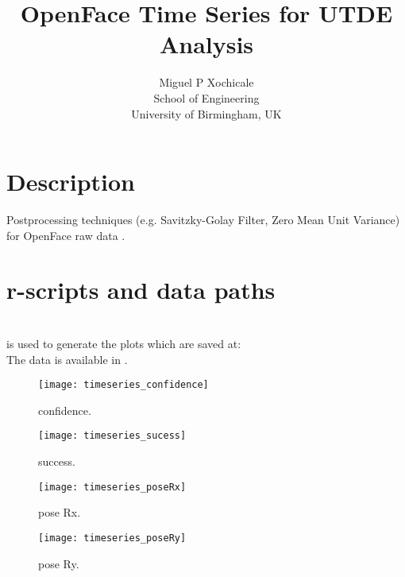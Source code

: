 \documentclass[a4paper,12pt]{article}
\title{OpenFace Time Series for UTDE Analysis}
\author{Miguel P Xochicale \\
School of Engineering\\
University of Birmingham, UK}
\begin{document}
\maketitle

%


\section{Description}


Postprocessing techniques (e.g. Savitzky-Golay Filter, Zero Mean Unit Variance)
for OpenFace raw data \cite{baltrusaitis2016}.


\section{r-scripts and data paths}
 \\
is used to generate the plots which are saved at: \\
The data is available in \cite{mxochicale2018}.













\begin{figure}
\centering
\texttt{[image: timeseries\_confidence]}
\caption{confidence.}
\end{figure}

\begin{figure}
\centering
\texttt{[image: timeseries\_sucess]}
\caption{success.}
\end{figure}




\begin{figure}
\centering
\texttt{[image: timeseries\_poseRx]}
\caption{pose Rx.}
\end{figure}


\begin{figure}
\centering
\texttt{[image: timeseries\_poseRy]}
\caption{pose Ry.}
\end{figure}
\end{document}
